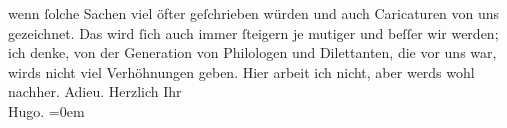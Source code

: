                     wenn ſolche Sachen viel öfter geſchrieben würden und auch Caricaturen von uns
                    gezeichnet. {\pb}Das wird ſich
                    auch immer ſteigern je mutiger und beſſer wir werden; ich denke, von der
                    Generation von Philologen und Dilettanten, die vor uns war, wirds nicht viel
                    Verhöhnungen geben.\pend
           \pstart
           Hier arbeit ich nicht, aber werds wohl nachher.\pend
           \pstart
           Adieu. Herzlich Ihr{\\[\baselineskip]}\spacefill\mbox{Hugo.}\pend
           \leftskip=0em{}\endnumbering{}  
      